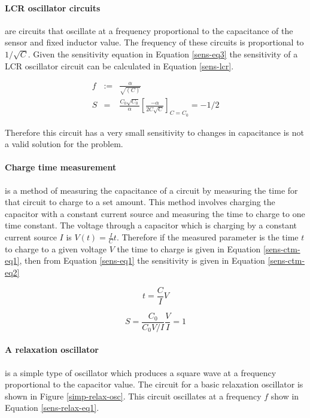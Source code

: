 \paragraph{LCR oscillator circuits} 
are circuits that oscillate at a frequency proportional to the capacitance of the sensor and fixed inductor value.  The frequency of these circuits is proportional to $1/\sqrt{C}$.  Given the sensitivity equation in Equation \ref{sens-eq3} the sensitivity of a LCR oscillator circuit can be calculated in Equation \ref{sens-lcr}.

\begin{eqnarray}
	f&:=&\frac{\alpha}{\sqrt{(C)}}\\
	S&=&\frac{C_0\sqrt{C_0}}{\alpha}\left[\frac{-\alpha}{2C\sqrt{C}}\right]_{C=C_0}=-1/2\label{sens-lcr}
\end{eqnarray} 

Therefore this circuit has a very small sensitivity to changes in capacitance is not a valid solution for the problem.

\paragraph{Charge time measurement} 
is a method of measuring the capacitance of a circuit by measuring the time for that circuit to charge to a set amount.  This method involves charging the capacitor with a constant current source and measuring the time to charge to one time constant.  The voltage through a capacitor which is charging by a constant current source $I$ is $V(t)=\frac{I}{C}t$.  Therefore if the measured parameter is the time $t$ to charge to a given voltage $V$ the time to charge is given in Equation \ref{sens-ctm-eq1}, then from Equation \ref{sens-eq1} the sensitivity is given in Equation \ref{sens-ctm-eq2}

\begin{equation}
	t=\frac{C}{I}V\label{sens-ctm-eq1}
\end{equation}

\begin{equation}
	S=\frac{C_0}{C_0V/I}\frac{V}{I}=1\label{sens-ctm-eq2}
\end{equation}

\paragraph{A relaxation oscillator} 
is a simple type of oscillator which produces a square wave at a frequency proportional to the capacitor value.  The circuit for a basic relaxation oscillator is shown in Figure \ref{simp-relax-osc}.  This circuit oscillates at a frequency $f$ show in Equation \ref{sens-relax-eq1}.

